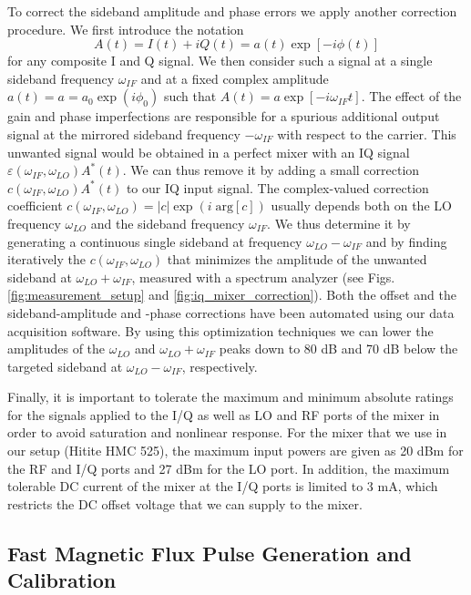 To correct the sideband amplitude and phase errors we apply another correction procedure. We first introduce the notation
\begin{equation}
A(t) = I(t)+iQ(t) = a(t)\exp{[-i \phi(t)]} \label{eq:iq_if_input}
\end{equation}
for any composite I and Q signal. We then consider such a signal at a single sideband frequency $\omega_{IF}$ and at a fixed complex amplitude $a(t)=a= a_0\exp{(i\phi_0)}$ such that $A(t) =a \exp{[-i \omega_{IF} t]} $. The effect of the gain and phase imperfections are responsible for a spurious additional output signal at the mirrored sideband frequency $-\omega_{IF}$ with respect to the carrier. This unwanted signal would be obtained in a perfect mixer with an IQ signal $\varepsilon(\omega_{IF},\omega_{LO})A^*(t)$. We can thus remove it by adding a small correction $c(\omega_{IF},\omega_{LO})A^*(t)$ to our IQ input signal. The complex-valued correction coefficient $c(\omega_{IF},\omega_{LO})=|c|\exp{(i\;\mathrm{arg}[c])}$ usually depends both on the LO frequency $\omega_{LO}$ and the sideband frequency $\omega_{IF}$. We thus determine it  by generating a continuous single sideband at frequency  $\omega_{LO}-\omega_{IF}$  and by finding  iteratively the  $c(\omega_{IF},\omega_{LO})$ that minimizes the amplitude of the unwanted sideband at $\omega_{LO}+\omega_{IF}$, measured with a spectrum analyzer (see Figs.  \ref{fig:measurement_setup} and \ref{fig:iq_mixer_correction}). Both the offset and the sideband-amplitude and -phase corrections have been automated using our data acquisition software. By using this optimization techniques we can lower the amplitudes of the $\omega_{LO}$  and $\omega_{LO}+\omega_{IF}$ peaks down to 80 dB and 70 dB below the targeted sideband at $\omega_{LO}-\omega_{IF}$, respectively.

\smallskip

Finally, it is important to tolerate the maximum and minimum absolute ratings for the signals applied to the I/Q  as well as LO and RF ports of the mixer in order to avoid saturation and nonlinear response. For the mixer that we use in our setup (Hitite HMC 525), the maximum input powers are given as 20 dBm for the RF and I/Q ports and 27 dBm for the LO port. In addition, the maximum tolerable DC current of the mixer at the I/Q ports is limited to 3 mA, which restricts the DC offset voltage that we can supply to the mixer.

\subsection{Fast Magnetic Flux Pulse Generation and Calibration}

